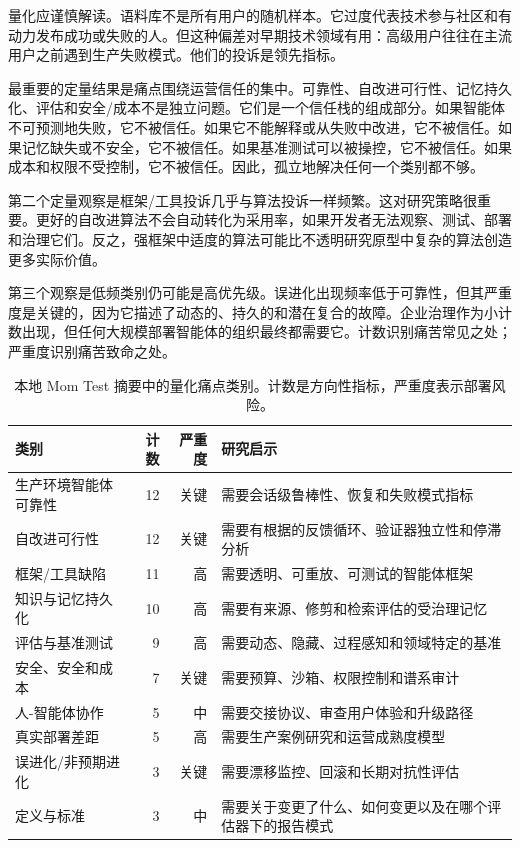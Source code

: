 量化应谨慎解读。语料库不是所有用户的随机样本。它过度代表技术参与社区和有动力发布成功或失败的人。但这种偏差对早期技术领域有用：高级用户往往在主流用户之前遇到生产失败模式。他们的投诉是领先指标。

最重要的定量结果是痛点围绕运营信任的集中。可靠性、自改进可行性、记忆持久化、评估和安全/成本不是独立问题。它们是一个信任栈的组成部分。如果智能体不可预测地失败，它不被信任。如果它不能解释或从失败中改进，它不被信任。如果记忆缺失或不安全，它不被信任。如果基准测试可以被操控，它不被信任。如果成本和权限不受控制，它不被信任。因此，孤立地解决任何一个类别都不够。

第二个定量观察是框架/工具投诉几乎与算法投诉一样频繁。这对研究策略很重要。更好的自改进算法不会自动转化为采用率，如果开发者无法观察、测试、部署和治理它们。反之，强框架中适度的算法可能比不透明研究原型中复杂的算法创造更多实际价值。

第三个观察是低频类别仍可能是高优先级。误进化出现频率低于可靠性，但其严重度是关键的，因为它描述了动态的、持久的和潜在复合的故障。企业治理作为小计数出现，但任何大规模部署智能体的组织最终都需要它。计数识别痛苦常见之处；严重度识别痛苦致命之处。

\begin{table}[htbp]
\centering
\small
\begin{tabular}{lrrp{}}
\toprule
\textbf{类别} & \textbf{计数} & \textbf{严重度} & \textbf{研究启示} \\
\midrule
生产环境智能体可靠性 & 12 & 关键 & 需要会话级鲁棒性、恢复和失败模式指标 \\
自改进可行性 & 12 & 关键 & 需要有根据的反馈循环、验证器独立性和停滞分析 \\
框架/工具缺陷 & 11 & 高 & 需要透明、可重放、可测试的智能体框架 \\
知识与记忆持久化 & 10 & 高 & 需要有来源、修剪和检索评估的受治理记忆 \\
评估与基准测试 & 9 & 高 & 需要动态、隐藏、过程感知和领域特定的基准 \\
安全、安全和成本 & 7 & 关键 & 需要预算、沙箱、权限控制和谱系审计 \\
人-智能体协作 & 5 & 中 & 需要交接协议、审查用户体验和升级路径 \\
真实部署差距 & 5 & 高 & 需要生产案例研究和运营成熟度模型 \\
误进化/非预期进化 & 3 & 关键 & 需要漂移监控、回滚和长期对抗性评估 \\
定义与标准 & 3 & 中 & 需要关于变更了什么、如何变更以及在哪个评估器下的报告模式 \\
\bottomrule
\end{tabular}
\caption{本地 Mom Test 摘要中的量化痛点类别。计数是方向性指标，严重度表示部署风险。}
\label{tab:ch7-quantified-categories-english}
\end{table}

